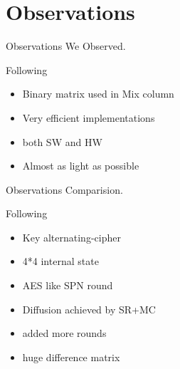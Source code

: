 \section{Observations}

\begin{frame}{Observations}
	We Observed.
	\begin{block}{Following}
		\begin{itemize}[<+->]
			\item Binary matrix used in Mix column
			\item Very efficient implementations
			\item both SW and HW
			\item Almost as light as possible 
		\end{itemize}
	\end{block}
\end{frame}
\begin{frame}{Observations}
	Comparision.
	\begin{block}{Following}
		\begin{itemize}[<+->]
			\item Key alternating-cipher
			\item 4*4 internal state
			\item AES like SPN round
			\item Diffusion achieved by SR+MC
			\item added more rounds
			\item huge difference matrix 
		\end{itemize}
	\end{block}
\end{frame}